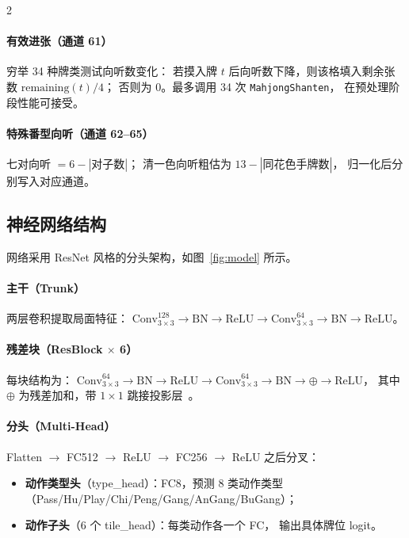 \documentclass{article}
\begin{document}
\begin{multicols}{2}
\paragraph{有效进张（通道 61）}
穷举 34 种牌类测试向听数变化：
若摸入牌 $t$ 后向听数下降，则该格填入剩余张数 $\text{remaining}(t)/4$；
否则为 0。最多调用 34 次 \texttt{MahjongShanten}，
在预处理阶段性能可接受。

\paragraph{特殊番型向听（通道 62--65）}
七对向听 $= 6 - |\text{对子数}|$；
清一色向听粗估为 $13 - |\text{同花色手牌数}|$，
归一化后分别写入对应通道。

\subsection{神经网络结构}

网络采用 ResNet 风格的分头架构，如图~\ref{fig:model} 所示。

\paragraph{主干（Trunk）}
两层卷积提取局面特征：
$\text{Conv}_{3\times3}^{128} \to \text{BN} \to \text{ReLU}
 \to \text{Conv}_{3\times3}^{64} \to \text{BN} \to \text{ReLU}$。

\paragraph{残差块（ResBlock $\times$ 6）}
每块结构为：
$\text{Conv}_{3\times3}^{64} \to \text{BN} \to \text{ReLU}
 \to \text{Conv}_{3\times3}^{64} \to \text{BN} \to \oplus \to \text{ReLU}$，
其中 $\oplus$ 为残差加和，带 $1\times1$ 跳接投影层~\cite{he2016deep}。

\paragraph{分头（Multi-Head）}
Flatten $\to$ FC512 $\to$ ReLU $\to$ FC256 $\to$ ReLU 之后分叉：
\begin{itemize}[leftmargin=*,topsep=2pt,itemsep=1pt,parsep=0pt]
  \item \textbf{动作类型头}（type\_head）：FC8，预测 8 类动作类型
    （Pass/Hu/Play/Chi/Peng/Gang/AnGang/BuGang）；
  \item \textbf{动作子头}（6 个 tile\_head）：每类动作各一个 FC，
    输出具体牌位 logit。
\end{itemize}


\end{multicols}
\end{document}
